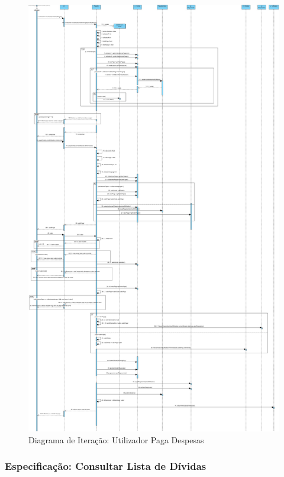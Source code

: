 \begin{figure}[htb!]
	\centering
	\includegraphics[scale=0.18]{imagens/DiagramaIt/UtilizadorPagaFactura}  
	\caption{Diagrama de Iteração: Utilizador Paga Despesas}  
\end{figure}

\newpage
\subsubsection{Especificação: Consultar Lista de Dívidas }

